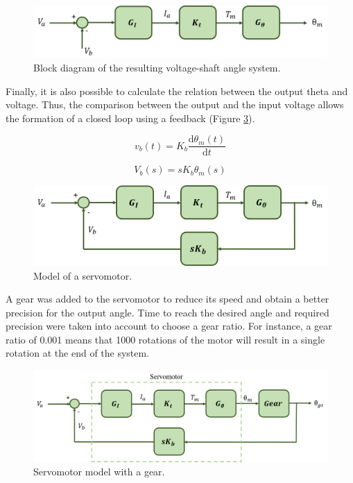 \begin{figure}[H]
\centering
\includegraphics[scale=0.6]{figures/model3.png}
\caption{Block diagram of the resulting voltage-shaft angle system.}
\label{model3}
\end{figure}

Finally, it is also possible to calculate the relation between the output theta and voltage. Thus, the comparison between the output and the input voltage allows the formation of a closed loop using a feedback (Figure \ref{model4}).

\begin{equation}\label{feedback1}
v_{b}(t)= K_{b}\frac{\mathrm{d} \theta_{m}(t)}{\mathrm{d} t}
\end{equation}

\begin{equation}\label{feedback2}
V_{b}(s)= sK_{b}\theta_{m}(s)
\end{equation}

\begin{figure}[H]
\centering
\includegraphics[scale=0.6]{figures/model4.png}
\caption{Model of a servomotor.}
\label{model4}
\end{figure}

A gear was added to the servomotor to reduce its speed and obtain a better precision for the output angle. Time to reach the desired angle and required precision were taken into account to choose a gear ratio.
For instance, a gear ratio of 0.001 means that 1000 rotations of the motor will result in a single rotation at the end of the system.

\begin{figure}[H]
\centerline{
\includegraphics[scale=0.6]{figures/servo+gear.png}}
\caption{Servomotor model with a gear.}
\label{model4}
\end{figure}

